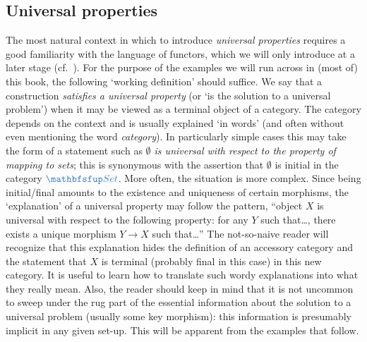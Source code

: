 \subsection{Universal properties}%
\label{subsec:prelims:universal-properties}
The most natural context in which to introduce \emph{universal
  properties} requires a good familiarity with the language of
functors, which we will only introduce at a later stage (cf.\
). For the purpose of the examples we
will run across in (most of) this book, the following `working
definition' should suffice.  We say that a construction
\emph{satisfies a universal property} (or `is the solution to a
universal problem') when it may be viewed as a terminal object of a
category. The category depends on the context and is usually explained
`in words' (and often without even mentioning the word
\emph{category}).  In particularly simple cases this may take the form
of a statement such as \emph{$\emptyset$ is universal with respect to
  the property of mapping to sets}; this is synonymous with the
assertion that $\emptyset$ is initial in the category $\categ{Set}$.
More often, the situation is more complex. Since being initial/final
amounts to the existence and uniqueness of certain morphisms, the
`explanation' of a universal property may follow the pattern, ``object
$X$ is universal with respect to the following property: for any $Y$
such that\ldots, there exists a unique morphism $Y \to X$ such
that\ldots'' The not-so-naive reader will recognize that this
explanation hides the definition of an accessory category and the
statement that $X$ is terminal (probably final in this case) in this
new category. It is useful to learn how to translate such wordy
explanations into what they really mean. Also, the reader should keep
in mind that it is not uncommon to sweep under the rug part of the
essential information about the solution to a universal problem
(usually some key morphism): this information is presumably implicit
in any given set-up.  This will be apparent from the examples that
follow.

